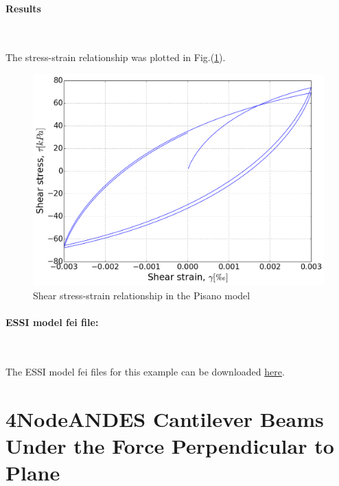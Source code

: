 \documentclass[fleqn,11pt]{article}
\begin{document}
\newpage
\paragraph{Results} ~

The stress-strain relationship was plotted in Fig.(\ref{fig Shear stress-strain relationship in the Pisano model}). 

\begin{figure}[H]
  \centering
  \includegraphics[width=12cm]{../Figure-files/pisanoLT_test01.png}
  \caption{Shear stress-strain relationship in the Pisano model}
  \label{fig Shear stress-strain relationship in the Pisano model}
\end{figure}

\paragraph{ESSI model fei file: } ~



The ESSI model fei files for this example can be downloaded \href{https://github.com/yuan-energy/Real-ESSI-Examples/blob/master/model_fei_file/shearbeam_pisano_plastic/shearbeam_pisano_plastic.tgz?raw=true}{here}.









\newpage
\section{4NodeANDES Cantilever Beams Under the Force Perpendicular to Plane}
\end{document}
